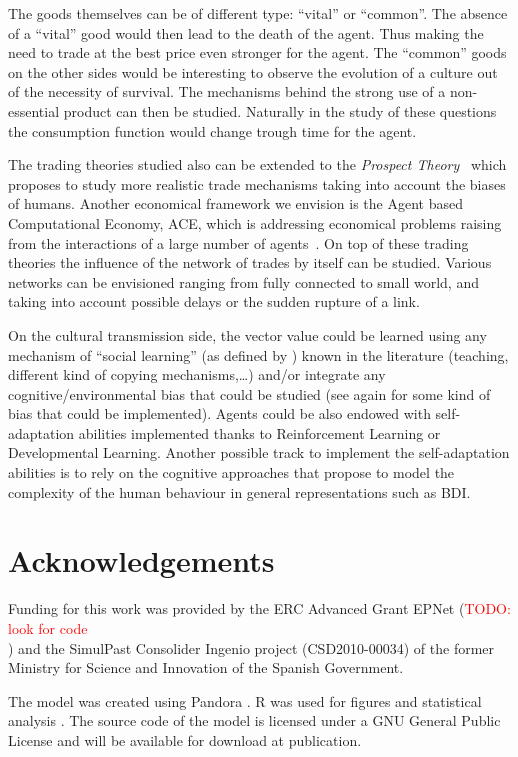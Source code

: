 \documentclass{wscpaperproc}
\newcommand{\memo}[2]{\textcolor{#1}{#2}}
\newcommand{\todo}[1]{\memo{red}{TODO: #1\\}}
\begin{document}
The goods themselves can be of different type: ``vital'' or ``common''. The absence of a ``vital'' good would then lead to the death of the agent. Thus making the need to trade at the best price even stronger for the agent. The ``common'' goods on the other sides would be interesting to observe the evolution of a culture out of the necessity of survival. The mechanisms behind the strong use of a non-essential product can then be studied. Naturally in the study of these questions the consumption function would change trough time for the agent.

The trading theories studied also can be extended to the \emph{Prospect Theory}~\cite{kahneman_prospect_1979} which proposes to study more realistic trade mechanisms taking into account the biases of humans. Another economical framework we envision is the Agent based Computational Economy, ACE, which is  addressing economical problems raising from the interactions of a large number of agents~\cite{tesfatsion_introduction_2001}. On top of these trading theories the influence of the network of trades by itself can be studied. Various networks can be envisioned ranging from fully connected to small world, and taking into account possible delays or the sudden rupture of a link.


On the cultural transmission side, the vector value could be learned using any mechanism of ``social learning'' (as defined by \cite{lycett_cultural_2015}) known in the literature (teaching, different kind of copying mechanisms,\ldots) and/or integrate any cognitive/environmental bias that could be studied (see again \cite{lycett_cultural_2015} for some kind of bias that could be implemented). Agents could be also endowed with self-adaptation abilities implemented thanks to Reinforcement Learning or Developmental Learning. Another possible track to implement the self-adaptation abilities is to rely on the cognitive approaches that propose to model the complexity of the human behaviour in general representations such as BDI.

\section{Acknowledgements}

Funding for this work was provided by the ERC Advanced Grant EPNet (\todo{look for code}) and the SimulPast Consolider Ingenio project (CSD2010-00034) of the former Ministry for Science and Innovation of the Spanish Government. 

The model was created using Pandora \cite{rubiocampillo_2014}. R was used for figures and statistical analysis \cite{rdev_2012}. The source code of the model is licensed under a GNU General Public License and will be available for download at publication.


  
\end{document}
